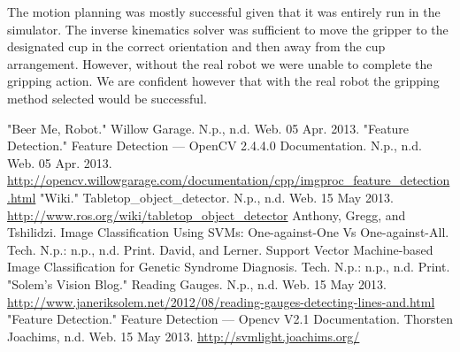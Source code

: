 \documentclass[letterpaper, 10 pt, conference]{ieeeconf}  %
\begin{document}
The motion planning was mostly successful given that it was entirely run in the simulator. The inverse kinematics solver was sufficient to move the gripper to the designated cup in the correct orientation and then away from the cup arrangement. However, without the real robot we were unable to complete the gripping action. We are confident however that with the real robot the gripping method selected would be successful.

\begin{thebibliography}{99}

 "Beer Me, Robot." Willow Garage. N.p., n.d. Web. 05 Apr. 2013.
 "Feature Detection." Feature Detection — OpenCV 2.4.4.0 Documentation. N.p., n.d. Web. 05 Apr. 2013. \url{http://opencv.willowgarage.com/documentation/cpp/imgproc_feature_detection.html}
 "Wiki." Tabletop\_object\_detector. N.p., n.d. Web. 15 May 2013. \url{http://www.ros.org/wiki/tabletop_object_detector}
 Anthony, Gregg, and Tshilidzi. Image Classification Using SVMs: One-against-One Vs One-against-All. Tech. N.p.: n.p., n.d. Print.
 David, and Lerner. Support Vector Machine-based Image Classiﬁcation for Genetic Syndrome Diagnosis. Tech. N.p.: n.p., n.d. Print.
 "Solem's Vision Blog." Reading Gauges. N.p., n.d. Web. 15 May 2013. \url{http://www.janeriksolem.net/2012/08/reading-gauges-detecting-lines-and.html}
 "Feature Detection." Feature Detection — Opencv V2.1 Documentation. Thorsten Joachims, n.d. Web. 15 May 2013. \url{http://svmlight.joachims.org/}






\end{thebibliography}
\end{document}
